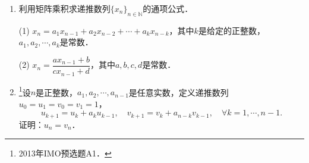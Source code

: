 \documentclass[a4paper,fontset=windows]{ctexbook}
\theoremstyle{definition}
\begin{document}
\begin{enumerate}
\item 利用矩阵乘积求递推数列$\{x_n\}_{n\in\mathbb{N}}$的通项公式．

(1) $x_n=a_1x_{n-1}+a_2x_{n-2}+\cdots+a_kx_{n-k}$，其中$k$是给定的正整数，$a_1,a_2,\cdots,a_k$是常数．

(2) $x_n=\dfrac{ax_{n-1}+b}{cx_{n-1}+d}$，其中$a,b,c,d$是常数．

\item \footnote{2013年IMO预选题A1．}设$n$是正整数，$a_1,a_2,\cdots,a_{n-1}$是任意实数，定义递推数列$u_0=u_1=v_0=v_1=1$，
$$u_{k+1}=u_k+a_ku_{k-1},\quad v_{k+1}=v_k+a_{n-k}v_{k-1},\quad\forall k=1,\cdots,n-1.$$
证明：$u_n=v_n$．

\end{enumerate}
\end{document}

